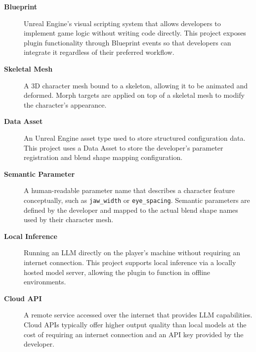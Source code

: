 \begin{description}
    \item[\textbf{Blueprint}] Unreal Engine's visual scripting system 
    that allows developers to implement game logic without writing 
    code directly. This project exposes plugin functionality through 
    Blueprint events so that developers can integrate it regardless 
    of their preferred workflow.

    \item[\textbf{Skeletal Mesh}] A 3D character mesh bound to a 
    skeleton, allowing it to be animated and deformed. Morph targets 
    are applied on top of a skeletal mesh to modify the character's 
    appearance.

    \item[\textbf{Data Asset}] An Unreal Engine asset type used to 
    store structured configuration data. This project uses a Data 
    Asset to store the developer's parameter registration and blend 
    shape mapping configuration.

    \item[\textbf{Semantic Parameter}] A human-readable parameter 
    name that describes a character feature conceptually, such as 
    \texttt{jaw\_width} or \texttt{eye\_spacing}. Semantic parameters 
    are defined by the developer and mapped to the actual blend shape 
    names used by their character mesh.

    \item[\textbf{Local Inference}] Running an LLM directly on the 
    player's machine without requiring an internet connection. This 
    project supports local inference via a locally hosted model 
    server, allowing the plugin to function in offline environments.

    \item[\textbf{Cloud API}] A remote service accessed over the 
    internet that provides LLM capabilities. Cloud APIs typically 
    offer higher output quality than local models at the cost of 
    requiring an internet connection and an API key provided by the 
    developer.
\end{description}
